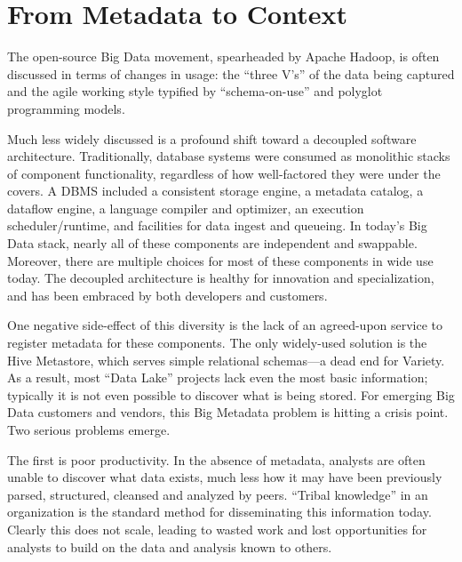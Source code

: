 \documentclass{sig-alternate}
\begin{document}
\section{From Metadata to Context}
The open-source Big Data movement, spearheaded by Apache Hadoop, is often discussed in terms of changes in usage: the ``three V's'' of the data being captured and the agile working style typified by ``schema-on-use'' and polyglot programming models.

Much less widely discussed is a profound shift toward a decoupled software architecture. Traditionally, database systems were consumed as monolithic stacks of component functionality, regardless of how well-factored they were under the covers. A DBMS included a consistent storage engine, a metadata catalog, a dataflow engine, a language compiler and optimizer, an execution scheduler/runtime, and facilities for data ingest and queueing. In today's Big Data stack, nearly all of these components are independent and swappable. Moreover, there are multiple choices for most of these components in wide use today. The decoupled architecture is healthy for innovation and specialization, and has been embraced by both developers and customers.

One negative side-effect of this diversity is the lack of an agreed-upon service to register metadata for these components. The only widely-used solution is the Hive Metastore, which serves simple relational schemas---a dead end for Variety. As a result, most ``Data Lake'' projects lack even the most basic information; typically it is not even possible to discover what is being stored. 
For emerging Big Data customers and vendors, this Big Metadata problem is hitting a crisis point.  Two serious problems emerge.

The first is poor productivity.
In the absence of metadata, analysts are often unable to discover what data exists, much less how it may have been previously parsed, structured, cleansed and analyzed by peers. ``Tribal knowledge'' in an organization is the standard method for disseminating this information today. Clearly this does not scale, leading to wasted work and lost opportunities for analysts to build on the data and analysis known to others.
\end{document}
